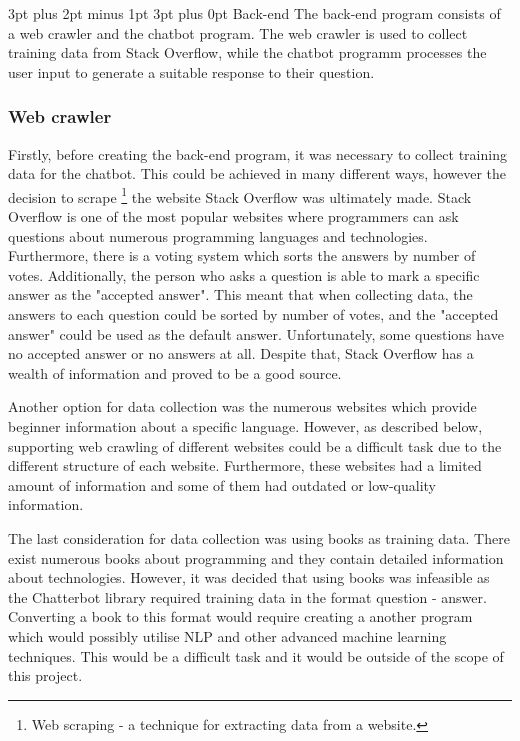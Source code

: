 \documentclass[12pt,a4paper]{article}
\makeatletter
\renewcommand\subsection{\@startsection {subsection}{1}{2mm} %
                                        {3pt plus 2pt minus 1pt} %
                                        {3pt plus 0pt} %
                                        {\normalfont\bfseries}}
\makeatother
\begin{document}
\subsection{Back-end}
The back-end program consists of a web crawler and the chatbot program. The web crawler is used to collect training data from Stack Overflow, while the chatbot programm processes the user input to generate a suitable response to their question.

\subsubsection{Web crawler}
Firstly, before creating the back-end program, it was necessary to collect training data for the chatbot. This could be achieved in many different ways, however the decision to scrape \footnote{Web scraping - a technique for extracting data from a website.} the website Stack Overflow was ultimately made. Stack Overflow is one of the most popular websites where programmers can ask questions about numerous programming languages and technologies. Furthermore, there is a voting system which sorts the answers by number of votes. Additionally, the person who asks a question is able to mark a specific answer as the "accepted answer". This meant that when collecting data, the answers to each question could be sorted by number of votes, and the "accepted answer" could be used as the default answer. Unfortunately, some questions have no accepted answer or no answers at all. Despite that, Stack Overflow has a wealth of information and proved to be a good source.

Another option for data collection was the numerous websites which provide beginner information about a specific language. However, as described below, supporting web crawling of different websites could be a difficult task due to the different structure of each website. Furthermore, these websites had a limited amount of information and some of them had outdated or low-quality information.

The last consideration for data collection was using books as training data. There exist numerous books about programming and they contain detailed information about technologies. However, it was decided that using books was infeasible as the Chatterbot library required training data in the format question - answer. Converting a book to this format would require creating a another program which would possibly utilise NLP and other advanced machine learning techniques. This would be a difficult task and it would be outside of the scope of this project.
\end{document}
